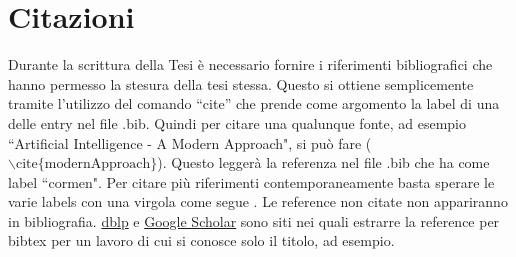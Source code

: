 \section{Citazioni}
Durante la scrittura della Tesi è necessario fornire i riferimenti bibliografici che hanno permesso la stesura della tesi stessa.
Questo si ottiene semplicemente tramite l'utilizzo del comando ``cite'' che prende come argomento la label di una delle entry nel file .bib.
Quindi per citare una qualunque fonte, ad esempio ``Artificial Intelligence - A Modern Approach", si può fare \cite{modernApproach} ($\backslash\text{cite}\{\text{modernApproach}\}$).
Questo leggerà la referenza nel file .bib che ha come label ``cormen".
Per citare più riferimenti contemporaneamente basta sperare le varie labels con una virgola come segue \cite{gelfond1998action,modernApproach,durfee1999distributed,de2003resource,allen2009complexity,bernstein2002complexity}.
Le reference non citate non appariranno in bibliografia.
\href{https://dblp.uni-trier.de/}{dblp} e \href{https://scholar.google.com/}{Google Scholar} sono siti nei quali estrarre la reference per bibtex per un lavoro di cui si conosce solo il titolo, ad esempio.
